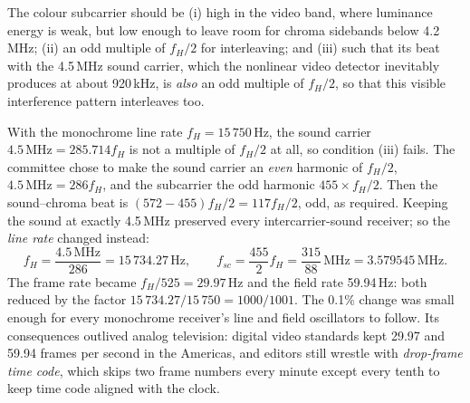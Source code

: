 \begin{worked}
The colour subcarrier should be (i) high in the video band, where luminance energy is weak, but low enough to
leave room for chroma sidebands below 4.2\,MHz; (ii) an odd multiple of $f_H/2$ for interleaving; and (iii)
such that its beat with the 4.5\,MHz sound carrier, which the nonlinear video detector inevitably produces at
about 920\,kHz, is \emph{also} an odd multiple of $f_H/2$, so that this visible interference pattern
interleaves too.

With the monochrome line rate $f_H=15\,750$\,Hz, the sound carrier $4.5\,\text{MHz}=285.714f_H$ is not a
multiple of $f_H/2$ at all, so condition (iii) fails. The committee chose to make the sound carrier an
\emph{even} harmonic of $f_H/2$, $4.5\,\text{MHz}=286f_H$, and the subcarrier the odd harmonic
$455\times f_H/2$. Then the sound--chroma beat is $(572-455)f_H/2=117f_H/2$, odd, as required. Keeping the
sound at exactly 4.5\,MHz preserved every intercarrier-sound receiver; so the \emph{line rate} changed instead:
\begin{equation}
f_H=\frac{4.5\,\text{MHz}}{286}=15\,734.27\,\text{Hz},\qquad
f_{sc}=\frac{455}{2}f_H=\frac{315}{88}\,\text{MHz}=3.579545\,\text{MHz}.
\end{equation}
The frame rate became $f_H/525=29.97$\,Hz and the field rate 59.94\,Hz: both reduced by the factor
$15\,734.27/15\,750=1000/1001$. The 0.1\% change was small enough for every monochrome receiver's line and
field oscillators to follow. Its consequences outlived analog television: digital video standards kept 29.97
and 59.94 frames per second in the Americas, and editors still wrestle with \emph{drop-frame time code}, which
skips two frame numbers every minute except every tenth to keep time code aligned with the clock.
\end{worked}

